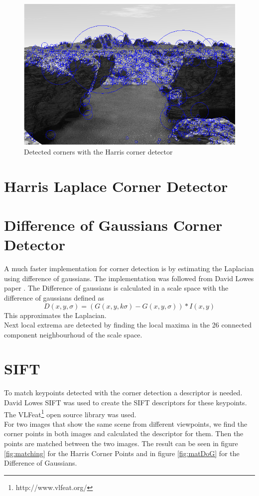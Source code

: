 \documentclass{article}
\begin{document}
\begin{figure}[ht]
\centering
\includegraphics[width=\textwidth]{img/Harris.png}
\caption{Detected corners with the Harris corner detector}
\label{fig:Harris}
\end{figure}

\section{Harris Laplace Corner Detector}



\section{Difference of Gaussians Corner Detector}

A much faster implementation for corner detection is by estimating the Laplacian using difference of gaussians. The implementation was followed from David Lowes paper \cite{Lowe}. The Difference of gaussians is calculated in a scale space with the difference of gaussians defined as
\begin{equation}
D(x,y,\sigma) = (G(x,y,k\sigma) - G(x,y,\sigma)) * I(x,y)
\end{equation}
This approximates the Laplacian.\\
Next local extrema are detected by finding the local maxima in the 26 connected component neighbourhoud of the scale space.

\section{SIFT}
To match keypoints detected with the corner detection a descriptor is needed. David Lowes SIFT was used to create the SIFT descriptors for these keypoints. The VLFeat\footnote{http://www.vlfeat.org/} open source library was used. \\
For two images that show the same scene from different viewpoints, we find the corner points in both images and calculated the descriptor for them. Then the points are matched between the two images. The result can be seen in figure \ref{fig:matching} for the Harris Corner Points and in figure \ref{fig:matDoG} for the Difference of Gaussians.
\end{document}
